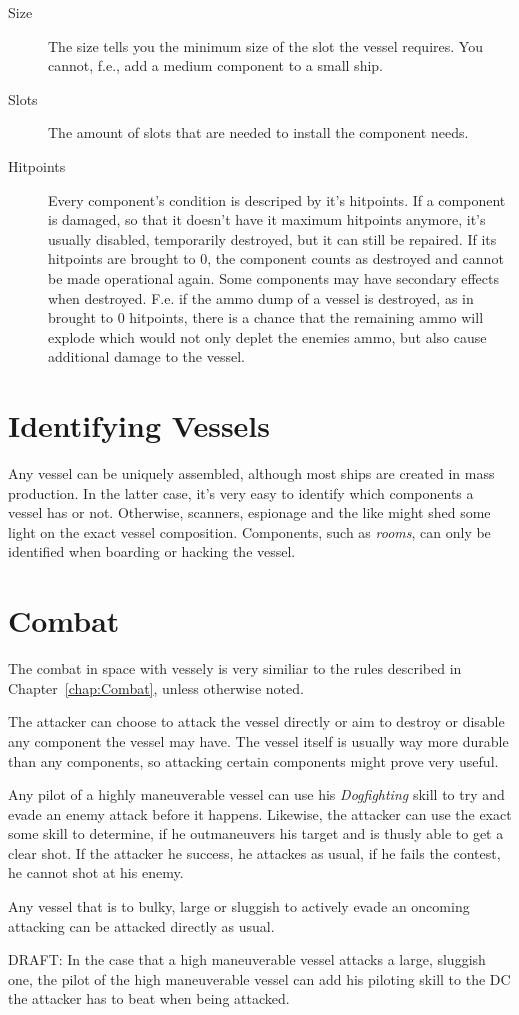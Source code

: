 \begin{description}
  \item[Size] The size tells you the minimum size of the slot the vessel requires. You cannot, f.e., add a medium component to a small ship.
  \item[Slots] The amount of slots that are needed to install the component needs.
  \item[Hitpoints] Every component's condition is descriped by it's hitpoints. If a component is damaged, so that it doesn't have it maximum hitpoints anymore, it's usually disabled, temporarily destroyed, but it can still be repaired. If its hitpoints are brought to 0, the component counts as destroyed and cannot be made operational again. Some components may have secondary effects when destroyed. F.e. if the ammo dump of a vessel is destroyed, as in brought to 0 hitpoints, there is a chance that the remaining ammo will explode which would not only deplet the enemies ammo, but also cause additional damage to the vessel.
\end{description}


\section{Identifying Vessels}
\label{sec:Vessels-Identifying Vessels}

Any vessel can be uniquely assembled, although most ships are created in mass production. In the latter case, it's very easy to identify which components a vessel has or not. Otherwise, scanners, espionage and the like might shed some light on the exact vessel composition. Components, such as \emph{rooms}, can only be identified when boarding or hacking the vessel.

\section{Combat}
\label{sec:Vessels-Combat}

The combat in space with vessely is very similiar to the rules described in Chapter~\ref{chap:Combat}, unless otherwise noted.

The attacker can choose to attack the vessel directly or aim to destroy or disable any component the vessel may have. The vessel itself is usually way more durable than any components, so attacking certain components might prove very useful.

Any pilot of a highly maneuverable vessel can use his \emph{Dogfighting} skill to try and evade an enemy attack before it happens. Likewise, the attacker can use the exact some skill to determine, if he outmaneuvers his target and is thusly able to get a clear shot. If the attacker he success, he attackes as usual, if he fails the contest, he cannot shot at his enemy.

Any vessel that is to bulky, large or sluggish to actively evade an oncoming attacking can be attacked directly as usual.

DRAFT: In the case that a high maneuverable vessel attacks a large, sluggish one, the pilot of the high maneuverable vessel can add his  piloting skill to the DC the attacker has to beat when being attacked.
